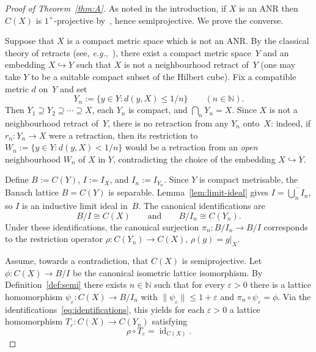 \documentclass[11pt]{amsart}
\renewcommand{\le}{\leqslant}
\numberwithin{equation}{section}
\theoremstyle{definition}
\theoremstyle{remark}
\theoremstyle{plain}
\DeclareMathOperator{\id}{id}
\begin{document}
\begin{proof}[Proof of Theorem~\ref{thm:A}]
As noted in the introduction, if $X$ is an ANR then $C(X)$ is $1^+$-projective
by~\cite[Theorem~1.4]{avilaes2020}, hence semiprojective.
We prove the converse.

Suppose that $X$ is a compact metric space which is not an ANR.
By the classical theory of retracts (see, \emph{e.g.},~\cite[Chapter~IV, \S3]{borsuk}),
there exist a compact metric space~$Y$ and an embedding $X\hookrightarrow Y$ such that
$X$ is not a neighbourhood retract of~$Y$
(one may take $Y$ to be a suitable compact subset of the Hilbert cube).
Fix a compatible metric $d$ on~$Y$ and set
\[
Y_n:=\bigl\{y\in Y: d(y,X)\le 1/n\bigr\}\qquad (n\in\mathbb N).
\]
Then $Y_1\supseteq Y_2\supseteq\cdots\supseteq X$, each $Y_n$ is compact,
and $\bigcap_n Y_n=X$.
Since $X$ is not a neighbourhood retract of~$Y$,
there is no retraction from any $Y_n$ onto~$X$:
indeed, if $r_n\colon Y_n\to X$ were a retraction, then its restriction to
$W_n:=\{y\in Y:d(y,X)<1/n\}$ would be a retraction from an \emph{open} neighbourhood
$W_n$ of $X$ in $Y$, contradicting the choice of the embedding $X\hookrightarrow Y$.

Define $B:=C(Y)$, $I:=I_X$, and $I_n:=I_{Y_n}$.
Since $Y$ is compact metrisable, the Banach lattice $B=C(Y)$ is separable.
Lemma~\ref{lem:limit-ideal} gives $I=\overline{\bigcup_{n} I_n}$,
so $I$ is an inductive limit ideal in~$B$.
The canonical identifications are
\begin{equation}\label{eq:identifications}
B/I\cong C(X)\qquad\text{and}\qquad B/I_n\cong C(Y_n).
\end{equation}
Under these identifications, the canonical surjection
$\pi_n\colon B/I_n\to B/I$ corresponds to the restriction operator
$\rho\colon C(Y_n)\to C(X)$, $\rho(g)=g|_X$.

Assume, towards a contradiction, that $C(X)$ is semiprojective.
Let $\phi\colon C(X)\to B/I$ be the canonical isometric lattice isomorphism.
By Definition~\ref{def:semi} there exists $n\in\mathbb N$ such that for every $\varepsilon>0$
there is a lattice homomorphism $\psi_\varepsilon\colon C(X)\to B/I_n$
with $\|\psi_\varepsilon\|\le 1+\varepsilon$ and $\pi_n\circ \psi_\varepsilon=\phi$.
Via the identifications~\eqref{eq:identifications},
this yields for each $\varepsilon>0$ a lattice homomorphism
$T_\varepsilon\colon C(X)\to C(Y_n)$ satisfying
\begin{equation}\label{eq:section}
\rho\circ T_\varepsilon=\id_{C(X)}.
\end{equation}


\end{proof}
\end{document}

